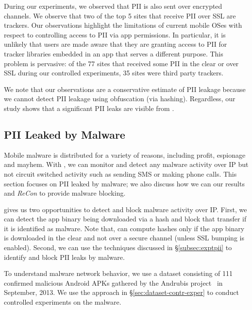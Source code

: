 During our experiments, we observed that PII is also sent over encrypted channels.  
We observe that two of the top 5 sites that receive PII over SSL are trackers.
Our observations highlight the limitations of current mobile OSes with respect to controlling access to PII via app permissions. 
In particular, it is unlikely that users are made aware that they are granting access to PII for tracker libraries embedded in an app that serves a different purpose. 
This problem is pervasive: of the 77 sites that received some PII in the clear or over SSL during our controlled experiments, 35 sites were third party trackers.

We note that our observations are a conservative estimate of PII leakage 
because we cannot detect PII leakage using obfuscation (\eg via hashing). 
Regardless, our study shows that a significant PII leaks are  
visible from \meddle. 

\subsection{PII Leaked by Malware}
\label{subsec:malware}

Mobile malware is distributed for a variety of reasons, including profit, espionage and mayhem. With  
\meddle, we can monitor and detect any malware activity over IP but not circuit switched activity such as 
sending SMS or making phone calls. This section focuses on PII leaked by malware; 
we also discuss how we can our results and \emph{ReCon} to provide malware blocking.

\meddle gives us two opportunities to detect and block malware activity over IP. 
First, we can detect the app binary being downloaded via a hash and block that transfer if it is identified as malware. 
Note that, \meddle can compute hashes only if the app binary is downloaded in the clear and not over a secure channel (unless SSL bumping is enabled).
Second, we can use the techniques discussed in \S\ref{subsec:exptpii} to identify and block PII leaks by malware. 

To understand malware network behavior, we use a dataset consisting of 111 confirmed malicious Android APKs 
gathered by the Andrubis project~\cite{andrubis} in September, 2013.  
We use the approach in \S\ref{sec:dataset-contr-exper} to conduct controlled experiments on the malware.

